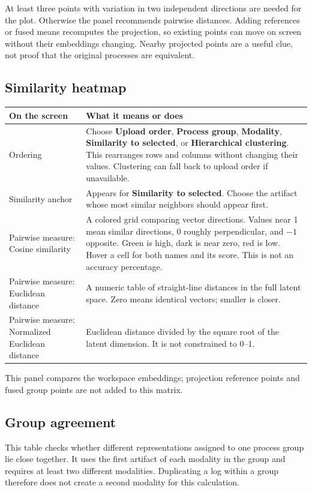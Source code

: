 \documentclass[11pt,a4paper]{article}
\makeatletter
\newcommand{\ui}[1]{\textbf{#1}}
\newenvironment{controls}{%
  \small\begin{longtable}{@{}>{\raggedright\arraybackslash}p{.34\linewidth}
    >{\raggedright\arraybackslash}p{.62\linewidth}@{}}
  \toprule\textbf{On the screen} & \textbf{What it means or does}\\\midrule\endhead
  \bottomrule\endfoot
}{\end{longtable}\normalsize}
\makeatother
\begin{document}
At least three points with variation in two independent directions are needed
for the plot. Otherwise the panel recommends pairwise distances. Adding
references or fused means recomputes the projection, so existing points can
move on screen without their embeddings changing. Nearby projected points
are a useful clue, not proof that the original processes are equivalent.

\subsection{Similarity heatmap}
\begin{controls}
Ordering & Choose \ui{Upload order}, \ui{Process group}, \ui{Modality},
\ui{Similarity to selected}, or \ui{Hierarchical clustering}. This rearranges
rows and columns without changing their values. Clustering can fall back to
upload order if unavailable.\\
Similarity anchor & Appears for \ui{Similarity to selected}. Choose the
artifact whose most similar neighbors should appear first.\\
Pairwise measure: Cosine similarity & A colored grid comparing vector
directions. Values near 1 mean similar directions, 0 roughly perpendicular,
and $-1$ opposite. Green is high, dark is near zero, red is low. Hover a cell
for both names and its score. This is not an accuracy percentage.\\
Pairwise measure: Euclidean distance & A numeric table of straight-line
distances in the full latent space. Zero means identical vectors; smaller is
closer.\\
Pairwise measure: Normalized Euclidean distance & Euclidean distance divided
by the square root of the latent dimension. It is not constrained to 0--1.\\
\end{controls}

This panel compares the workspace embeddings; projection reference points
and fused group points are not added to this matrix.

\subsection{Group agreement}
This table checks whether different representations assigned to one process
group lie close together. It uses the first artifact of each modality in the
group and requires at least two different modalities. Duplicating a log within
a group therefore does not create a second modality for this calculation.
\end{document}
